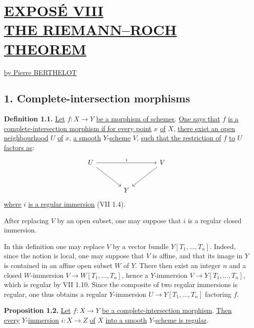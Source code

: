 %
\section*{\underline{EXPOSÉ VIII}\\[3pt] \underline{\underline{THE RIEMANN--ROCH THEOREM}}}
\begin{center}
\underline{by Pierre BERTHELOT}
\end{center}

\subsection*{1. Complete-intersection morphisms}

\textbf{Definition 1.1.} \uline{Let} $f:X\to Y$ \uline{be a morphism of schemes}. \uline{One says that} $f$ \uline{is a complete-intersection morphism if for every point} $x$ \uline{of} $X$, \uline{there exist an open neighbourhood} $U$ \uline{of} $x$, \uline{a smooth} $Y$-\uline{scheme} $V$, \uline{such that the restriction of} $f$ \uline{to} $U$ \uline{factors as}:
\[
\begin{tikzcd}[column sep=large,row sep=large]
U \arrow[rr,"i"] \arrow[dr] && V \arrow[dl]\\
& Y &
\end{tikzcd}
\]
\uline{where} $i$ \uline{is a regular immersion} (VII 1.4).

After replacing $V$ by an open subset, one may suppose that $i$ is a regular closed immersion.

In this definition one may replace $V$ by a vector bundle $Y[T_1,\ldots,T_n]$. Indeed, since the notion is local, one may suppose that $V$ is affine, and that its image in $Y$ is contained in an affine open subset $W$ of $Y$. There then exist an integer $n$ and a closed $W$-immersion $V\longrightarrow W[T_1,\ldots,T_n]$, hence a $Y$-immersion $V\to Y[T_1,\ldots,T_n]$, which is regular by VII 1.10. Since the composite of two regular immersions is regular, one thus obtains a regular $Y$-immersion $U\longrightarrow Y[T_1,\ldots,T_n]$ factoring $f$.

\textbf{Proposition 1.2.} \uline{Let} $f:X\to Y$ \uline{be a complete-intersection morphism}. \uline{Then every} $Y$-\uline{immersion} $i:X\to Z$ \uline{of} $X$ \uline{into a smooth} $Y$-\uline{scheme is regular}.

